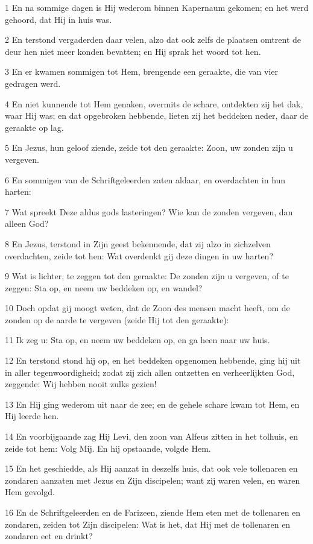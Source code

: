 \par 1 En na sommige dagen is Hij wederom binnen Kapernaum gekomen; en het werd gehoord, dat Hij in huis was.
\par 2 En terstond vergaderden daar velen, alzo dat ook zelfs de plaatsen omtrent de deur hen niet meer konden bevatten; en Hij sprak het woord tot hen.
\par 3 En er kwamen sommigen tot Hem, brengende een geraakte, die van vier gedragen werd.
\par 4 En niet kunnende tot Hem genaken, overmits de schare, ontdekten zij het dak, waar Hij was; en dat opgebroken hebbende, lieten zij het beddeken neder, daar de geraakte op lag.
\par 5 En Jezus, hun geloof ziende, zeide tot den geraakte: Zoon, uw zonden zijn u vergeven.
\par 6 En sommigen van de Schriftgeleerden zaten aldaar, en overdachten in hun harten:
\par 7 Wat spreekt Deze aldus gods lasteringen? Wie kan de zonden vergeven, dan alleen God?
\par 8 En Jezus, terstond in Zijn geest bekennende, dat zij alzo in zichzelven overdachten, zeide tot hen: Wat overdenkt gij deze dingen in uw harten?
\par 9 Wat is lichter, te zeggen tot den geraakte: De zonden zijn u vergeven, of te zeggen: Sta op, en neem uw beddeken op, en wandel?
\par 10 Doch opdat gij moogt weten, dat de Zoon des mensen macht heeft, om de zonden op de aarde te vergeven (zeide Hij tot den geraakte):
\par 11 Ik zeg u: Sta op, en neem uw beddeken op, en ga heen naar uw huis.
\par 12 En terstond stond hij op, en het beddeken opgenomen hebbende, ging hij uit in aller tegenwoordigheid; zodat zij zich allen ontzetten en verheerlijkten God, zeggende: Wij hebben nooit zulks gezien!
\par 13 En Hij ging wederom uit naar de zee; en de gehele schare kwam tot Hem, en Hij leerde hen.
\par 14 En voorbijgaande zag Hij Levi, den zoon van Alfeus zitten in het tolhuis, en zeide tot hem: Volg Mij. En hij opstaande, volgde Hem.
\par 15 En het geschiedde, als Hij aanzat in deszelfs huis, dat ook vele tollenaren en zondaren aanzaten met Jezus en Zijn discipelen; want zij waren velen, en waren Hem gevolgd.
\par 16 En de Schriftgeleerden en de Farizeen, ziende Hem eten met de tollenaren en zondaren, zeiden tot Zijn discipelen: Wat is het, dat Hij met de tollenaren en zondaren eet en drinkt?
